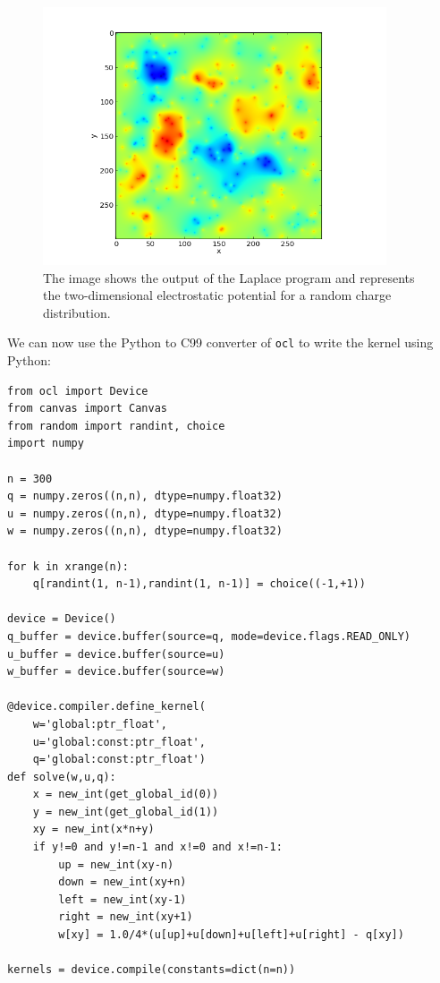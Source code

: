 \documentclass[justified,sixbynine]{tufte-book}
\def\ft{\small\tt}
\theoremstyle{plain}%
\theoremstyle{definition}
\theoremstyle{remark}
\begin{document}
\begin{fullwidth}
\begin{figure}[ht]
\begin{center}
\centering\includegraphics[width=4in]{images/plot.png}
\end{center}
\caption{The image shows the output of the Laplace program and represents the two-dimensional electrostatic potential for a random charge distribution.\label{fig_u}}
\end{figure}

We can now use the Python to C99 converter of {\ft ocl} to write the kernel using Python:

\begin{lstlisting}
from ocl import Device
from canvas import Canvas
from random import randint, choice
import numpy

n = 300
q = numpy.zeros((n,n), dtype=numpy.float32)
u = numpy.zeros((n,n), dtype=numpy.float32)
w = numpy.zeros((n,n), dtype=numpy.float32)

for k in xrange(n):
    q[randint(1, n-1),randint(1, n-1)] = choice((-1,+1))

device = Device()
q_buffer = device.buffer(source=q, mode=device.flags.READ_ONLY)
u_buffer = device.buffer(source=u)
w_buffer = device.buffer(source=w)

@device.compiler.define_kernel(
    w='global:ptr_float',
    u='global:const:ptr_float',
    q='global:const:ptr_float')
def solve(w,u,q):
    x = new_int(get_global_id(0))
    y = new_int(get_global_id(1))
    xy = new_int(x*n+y)
    if y!=0 and y!=n-1 and x!=0 and x!=n-1:
        up = new_int(xy-n)
        down = new_int(xy+n)
        left = new_int(xy-1)
        right = new_int(xy+1)
        w[xy] = 1.0/4*(u[up]+u[down]+u[left]+u[right] - q[xy])

kernels = device.compile(constants=dict(n=n))


\end{lstlisting}
\end{fullwidth}
\end{document}
